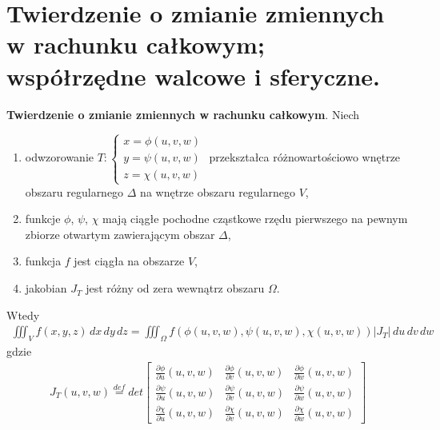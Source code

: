 \documentclass[main.tex]{subfiles}
\begin{document}
    \section{Twierdzenie o zmianie zmiennych w rachunku całkowym; współrzędne walcowe i sferyczne.}

    \begin{definition}
        \textbf{Twierdzenie o zmianie zmiennych w rachunku całkowym}. Niech
        \begin{enumerate}
            \item odwzorowanie $ T: \begin{cases}
                                        x = \phi(u,v,w) \\
                                        y = \psi(u,v,w) \\
                                        z = \chi(u,v,w)
            \end{cases}$ przekształca różnowartościowo wnętrze obszaru regularnego $\Delta$ na wnętrze obszaru
            regularnego $V$,
            \item funkcje $\phi$, $\psi$, $\chi$ mają ciągłe pochodne cząstkowe rzędu pierwszego na pewnym zbiorze
            otwartym zawierającym obszar $\Delta$,
            \item funkcja $f$ jest ciągła na obszarze $V$,
            \item jakobian $J_T$ jest różny od zera wewnątrz obszaru $\Omega$.
        \end{enumerate}
        Wtedy
        \begin{align*}
            \iiint_V f(x,y,z)\,dx\,dy\,dz = \iiint_{\Omega} f(\phi(u,v,w), \psi(u,v,w), \chi(u,v,w))
            |J_T| \,du\,dv\,dw
        \end{align*}
        gdzie
        \begin{align*}
            J_T (u,v, w) \stackrel{def}{=} det \begin{bmatrix}
                                                \frac{\partial \phi}{\partial u}(u,v,w)  & \frac{\partial \phi}{\partial v}(u,v,w) & \frac{\partial \phi}{\partial w}(u,v,w)\\
                                                \frac{\partial \psi}{\partial u}(u,v,w)  & \frac{\partial \psi}{\partial v}(u,v,w) & \frac{\partial \psi}{\partial w}(u,v,w)\\
                                                \frac{\partial \chi}{\partial u}(u,v,w)  & \frac{\partial \chi}{\partial v}(u,v,w) & \frac{\partial \chi}{\partial w}(u,v,w)
            \end{bmatrix}
        \end{align*}
    \end{definition}
\end{document}
